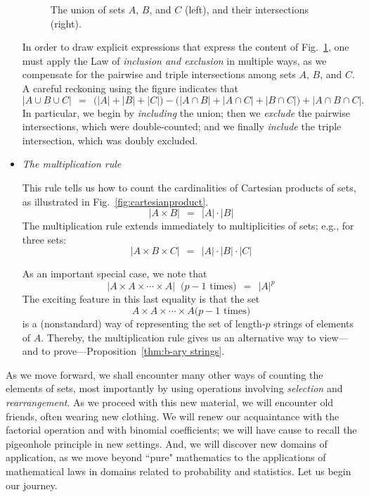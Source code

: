 \begin{itemize}
\begin{figure}[htb]
\begin{center}
        \caption{The union of sets $A$, $B$, and $C$ (left), and their intersections (right).}
        \label{fig:unionSets}
\end{center}
\end{figure}
In order to draw explicit expressions that express the content of  Fig.~\ref{fig:unionSets}, one must apply the Law of
{\em inclusion and exclusion} in multiple ways, as we compensate for the 
pairwise and triple intersections among  sets $A$, $B$, and $C$.  A careful reckoning using the figure 
indicates that
\[ |A \cup B \cup C| \ \ = \ \ 
\big(|A| + |B| + |C| \big) - \big( |A \cap B| + |A \cap C| + |B \cap C| \big) + |A \cap B \cap C|. \]
In particular, we begin by {\em including} the union; then we {\em exclude} the pairwise intersections, which
were double-counted; and we finally {\em include} the triple intersection, which was doubly excluded.

\item
{\em The multiplication rule} 

This rule tells us how to count the cardinalities of Cartesian products of sets, as
illustrated in Fig.~\ref{fig:cartesianproduct}.
\[ |A \times B| \ \ = \ \ |A| \cdot |B| \]
The multiplication rule extends immediately to multiplicities of sets; e.g., for three sets:
\[  |A \times B \times C| \ \ = \ \ |A| \cdot |B| \cdot |C| \]

As an important special case, we note that
\[ |A \times A \times \cdots  \times A| \ \mbox{ ($p-1$ times)}  \ \ = \ \ |A|^p \]
The exciting feature in this last equality is that the set
 \[ A \times A \times \cdots  \times A  \mbox{($p-1$ times)} \]
is a (nonstandard) way of representing the set of length-$p$ strings of elements of $A$.
Thereby, the multiplication rule gives us an alternative way to 
view---and to prove---Proposition~\ref{thm:b-ary strings}.
\end{itemize}

\bigskip

As we move forward, we shall encounter many other ways of counting the elements of sets,
most importantly by using operations involving {\it selection} and {\it rearrangement}.  As we
proceed with this new material, we will encounter old friends, often wearing new clothing.  We
will renew our acquaintance with the factorial operation and with binomial coefficients; we will
have cause to recall the pigeonhole principle in new settings.  And, we will discover new domains
of application, as we move beyond ``pure" mathematics to the applications of mathematical
laws in domains related to probability and statistics.
Let us begin our journey.

